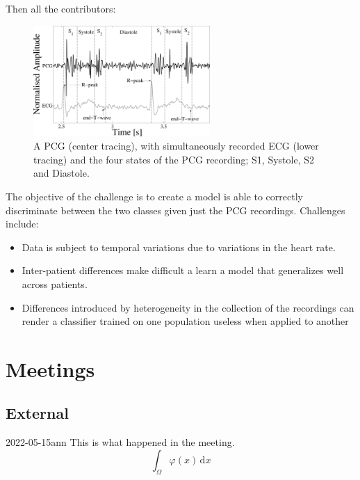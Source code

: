 \documentclass{project-logbook}
\begin{document}
Then all the contributors: {

\begin{figure}[h]
    \includegraphics[width=0.6\textwidth]{figures/PCG_ECG}
    \centering
    \caption{A PCG (center tracing), with simultaneously recorded ECG (lower tracing) and the four states of the PCG recording; S1, Systole, S2 and Diastole.}
    \label{fig:PCG_ECG}
\end{figure}

The objective of the challenge is to create a model is able to correctly discriminate between the two classes given just the PCG recordings. Challenges include:

\begin{itemize}
    \item Data is subject to temporal variations due to variations in the heart rate.
    \item Inter-patient differences make difficult a learn a model that generalizes well across patients.
    \item Differences introduced by heterogeneity in the collection of the recordings can render a classifier trained on one population useless when applied to another
\end{itemize}


\section{Meetings}
	\subsection{External}
		\begin{MeetingMinutes}{2022-05-15}{ann}
			This is what happened in the meeting.
			\begin{equation}
				\int_{\Omega}{\varphi(x)}\,\mathrm{d}x
			\end{equation}
			\lipsum[4]
		\end{MeetingMinutes}
	
}
\end{document}
